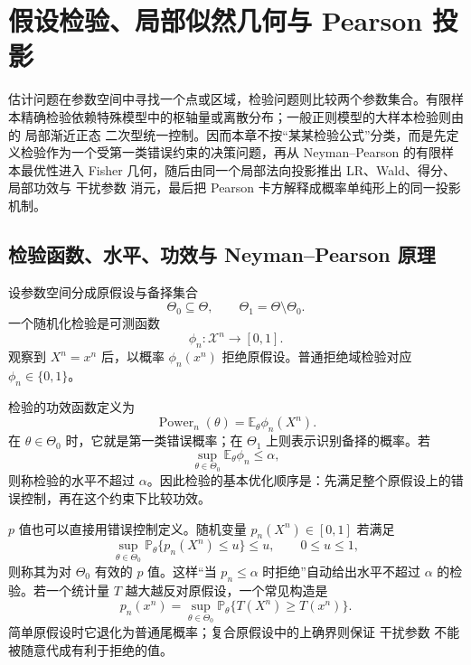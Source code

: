 \chapter{假设检验、局部似然几何与 Pearson 投影}\label{chap:math-stat-testing}

估计问题在参数空间中寻找一个点或区域，检验问题则比较两个参数集合。有限样本精确检验依赖特殊模型中的枢轴量或离散分布；一般正则模型的大样本检验则由  的 局部渐近正态 二次型统一控制。因而本章不按“某某检验公式”分类，而是先定义检验作为一个受第一类错误约束的决策问题，再从 Neyman--Pearson 的有限样本最优性进入 Fisher 几何，随后由同一个局部法向投影推出 LR、Wald、得分、局部功效与 干扰参数 消元，最后把 Pearson 卡方解释成概率单纯形上的同一投影机制。

\section{检验函数、水平、功效与 Neyman--Pearson 原理}

\begin{definition}[随机化检验]
设参数空间分成原假设与备择集合
\[
 \Theta_0\subseteq\Theta,
 \qquad
 \Theta_1=\Theta\setminus\Theta_0.
\]
一个随机化检验是可测函数
\[
 \phi_n:\mathcal X^n\to[0,1].
\]
观察到 $X^n=x^n$ 后，以概率 $\phi_n(x^n)$ 拒绝原假设。普通拒绝域检验对应 $\phi_n\in\{0,1\}$。
\end{definition}

\begin{definition}[水平、大小与功效]
检验的功效函数定义为
\[
 \operatorname{Power}_n(\theta)
 =\mathbb E_\theta\phi_n(X^n).
\]
在 $\theta\in\Theta_0$ 时，它就是第一类错误概率；在 $\Theta_1$ 上则表示识别备择的概率。若
\begin{equation*}\sup_{\theta\in\Theta_0}\mathbb E_\theta\phi_n\le\alpha,
\end{equation*}
则称检验的水平不超过 $\alpha$。因此检验的基本优化顺序是：先满足整个原假设上的错误控制，再在这个约束下比较功效。
\end{definition}

\begin{definition}[对复合零假设有效的 p 值]
$p$ 值也可以直接用错误控制定义。随机变量 $p_n(X^n)\in[0,1]$ 若满足
\[
 \sup_{\theta\in\Theta_0}
 \mathbb P_\theta\{p_n(X^n)\le u\}
 \le u,
 \qquad 0\le u\le1,
\]
则称其为对 $\Theta_0$ 有效的 $p$ 值。这样“当 $p_n\le\alpha$ 时拒绝”自动给出水平不超过 $\alpha$ 的检验。若一个统计量 $T$ 越大越反对原假设，一个常见构造是
\[
 p_n(x^n)
 =\sup_{\theta\in\Theta_0}
 \mathbb P_\theta\{T(X^n)\ge T(x^n)\}.
\]
简单原假设时它退化为普通尾概率；复合原假设中的上确界则保证 干扰参数 不能被随意代成有利于拒绝的值。
\end{definition}

